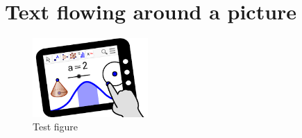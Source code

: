 \documentclass[a5paper]{article}
\begin{document}
\section*{Text flowing around a picture}
\blindtext
\begin{figure}
\includegraphics[width=4.4cm]{geo.png}
\caption{Test figure}
\end{figure}
\blindtext
\end{document}
